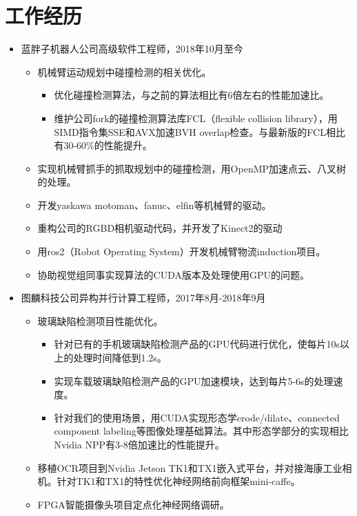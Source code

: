 \documentclass[letterpaper]{article}
\begin{document}
\section*{工作经历}
\begin{itemize}
  \item 蓝胖子机器人公司高级软件工程师，2018年10月至今
    \begin{itemize}
      \item 机械臂运动规划中碰撞检测的相关优化。
        \begin{itemize}
          \item 优化碰撞检测算法，与之前的算法相比有6倍左右的性能加速比。
          \item 维护公司fork的碰撞检测算法库FCL（flexible collision library），用SIMD指令集SSE和AVX加速BVH overlap检查。与最新版的FCL相比有30-60\%的性能提升。
        \end{itemize}
      \item 实现机械臂抓手的抓取规划中的碰撞检测，用OpenMP加速点云、八叉树的处理。
      \item 开发yaskawa motoman、fanuc、elfin等机械臂的驱动。
      \item 重构公司的RGBD相机驱动代码，并开发了Kinect2的驱动
      \item 用ros2（Robot Operating System）开发机械臂物流induction项目。
      \item 协助视觉组同事实现算法的CUDA版本及处理使用GPU的问题。
    \end{itemize}
  \item 图麟科技公司异构并行计算工程师，2017年8月-2018年9月
    \begin{itemize}
      \item 玻璃缺陷检测项目性能优化。
        \begin{itemize}
          \item 针对已有的手机玻璃缺陷检测产品的GPU代码进行优化，使每片10s以上的处理时间降低到1.2s。
          \item 实现车载玻璃缺陷检测产品的GPU加速模块，达到每片5-6s的处理速度。
          \item 针对我们的使用场景，用CUDA实现形态学erode/dilate、connected component labeling等图像处理基础算法。其中形态学部分的实现相比Nvidia NPP有3-8倍加速比的性能提升。
        \end{itemize}
      \item 移植OCR项目到Nvidia Jetson TK1和TX1嵌入式平台，并对接海康工业相机。针对TK1和TX1的特性优化神经网络前向框架mini-caffe。
      \item FPGA智能摄像头项目定点化神经网络调研。

\end{itemize}
\end{itemize}
\end{document}
